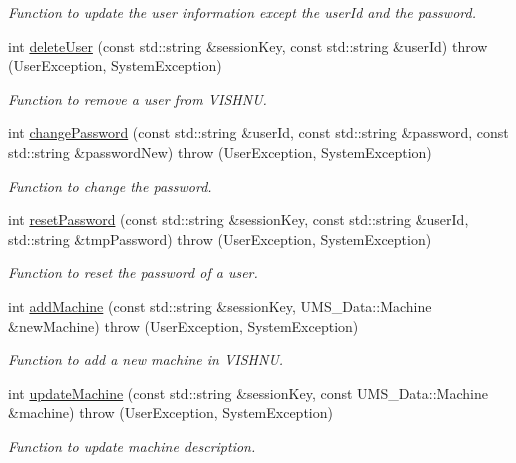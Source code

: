\begin{DoxyCompactItemize}
\begin{DoxyCompactList}\small\item\em Function to update the user information except the userId and the password. \item\end{DoxyCompactList}\item 
int \hyperlink{namespacevishnu_a6c83f6b72fdb7ac3b240f14a19f11786}{deleteUser} (const std::string \&sessionKey, const std::string \&userId)  throw (UserException, SystemException)
\begin{DoxyCompactList}\small\item\em Function to remove a user from VISHNU. \item\end{DoxyCompactList}\item 
int \hyperlink{namespacevishnu_a24ec95c164ce8905b8eccf98e9bb633e}{changePassword} (const std::string \&userId, const std::string \&password, const std::string \&passwordNew)  throw (UserException, SystemException)
\begin{DoxyCompactList}\small\item\em Function to change the password. \item\end{DoxyCompactList}\item 
int \hyperlink{namespacevishnu_a11f16b7501b8814c491d13431409051c}{resetPassword} (const std::string \&sessionKey, const std::string \&userId, std::string \&tmpPassword)  throw (UserException, SystemException)
\begin{DoxyCompactList}\small\item\em Function to reset the password of a user. \item\end{DoxyCompactList}\item 
int \hyperlink{namespacevishnu_aca4f5c2716ce1dd8ddc15a2554c95004}{addMachine} (const std::string \&sessionKey, UMS\_\-Data::Machine \&newMachine)  throw (UserException, SystemException)
\begin{DoxyCompactList}\small\item\em Function to add a new machine in VISHNU. \item\end{DoxyCompactList}\item 
int \hyperlink{namespacevishnu_a1f8fe4e8fa5956be1f264e9a5f78c9f1}{updateMachine} (const std::string \&sessionKey, const UMS\_\-Data::Machine \&machine)  throw (UserException, SystemException)
\begin{DoxyCompactList}\small\item\em Function to update machine description. \item\end{DoxyCompactList}\item 

\end{DoxyCompactItemize}
